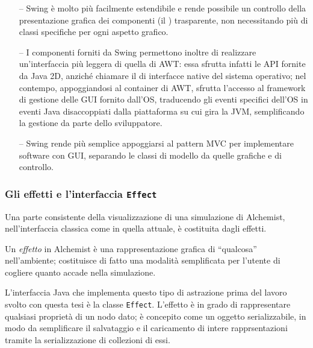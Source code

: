                 \begin{itemize}
                    \item[--] Swing è molto più facilmente estendibile e rende possibile un controllo della presentazione grafica dei componenti (il ) trasparente, non necessitando più di classi specifiche per ogni aspetto grafico.

                    \item[--] I componenti forniti da Swing permettono inoltre di realizzare un'interfaccia più leggera di quella di AWT: essa sfrutta infatti le API fornite da Java 2D, anziché chiamare il  di interfacce native del sistema operativo; nel contempo, appoggiandosi al container di AWT, sfrutta l'accesso al framework di gestione delle GUI fornito dall'OS, traducendo gli eventi specifici dell'OS in eventi Java disaccoppiati dalla piattaforma su cui gira la JVM, semplificando la gestione da parte dello sviluppatore.

                    \item[--] Swing rende più semplice appoggiarsi al pattern MVC per implementare software con GUI, separando le classi di modello da quelle grafiche e di controllo.

                \end{itemize}

            \subsubsection{Gli effetti e l'interfaccia \texttt{Effect}}\label{subsub:effect}
                Una parte consistente della visualizzazione di una simulazione di Alchemist, nell'interfaccia classica come in quella attuale, è costituita dagli effetti.

                Un \emph{effetto} in Alchemist è una rappresentazione grafica di ``qualcosa'' nell'ambiente; costituisce di fatto una modalità semplificata per l'utente di cogliere quanto accade nella simulazione.

                L'interfaccia Java che implementa questo tipo di astrazione prima del lavoro svolto con questa tesi è la classe \texttt{Effect}.
                L'effetto è in grado di rappresentare qualsiasi proprietà di un nodo dato; è concepito come un oggetto serializzabile, in modo da semplificare il salvataggio e il caricamento di intere rapprsentazioni tramite la serializzazione di collezioni di essi.

